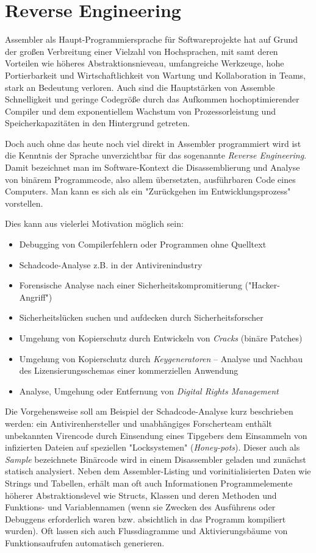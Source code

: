 \section{Reverse Engineering}

Assembler als Haupt-Programmiersprache für Softwareprojekte hat auf Grund der großen Verbreitung einer Vielzahl von Hochsprachen, mit samt deren Vorteilen wie höheres Abstraktionsnieveau, umfangreiche Werkzeuge, hohe Portierbarkeit und Wirtschaftlichkeit von Wartung und Kollaboration in Teams, stark an Bedeutung verloren. Auch sind die Hauptstärken von Assemble Schnelligkeit und geringe Codegröße durch das Aufkommen hochoptimierender Compiler und dem exponentiellem Wachstum von Prozessorleistung und Speicherkapazitäten in den Hintergrund getreten.

Doch auch ohne das heute noch viel direkt in Assembler programmiert wird ist die Kenntnis der Sprache unverzichtbar für das sogenannte \emph{Reverse Engineering}. Damit bezeichnet man im Software-Kontext die Disassemblierung und Analyse von binärem Programmcode, also allem übersetzten, ausführbaren Code eines Computers. Man kann es sich als ein "Zurückgehen im Entwicklungsprozess" vorstellen.\cite{Warden1992}

Dies kann aus vielerlei Motivation möglich sein:
\begin{itemize}
\item Debugging von Compilerfehlern oder Programmen ohne Quelltext
\item Schadcode-Analyse z.B. in der Antivirenindustry
\item Forensische Analyse nach einer Sicherheitskompromitierung ("Hacker-Angriff")
\item Sicherheitslücken suchen und aufdecken durch Sicherheitsforscher
\item Umgehung von Kopierschutz durch Entwickeln von \emph{Cracks} (binäre Patches)
\item Umgehung von Kopierschutz durch \emph{Keygeneratoren} – Analyse und Nachbau des Lizensierungsschemas einer kommerziellen Anwendung
\item Analyse, Umgehung oder Entfernung von \emph{Digital Rights Management}
\end{itemize}

Die Vorgehensweise soll am Beispiel der Schadcode-Analyse kurz beschrieben werden: ein Antivirenhersteller und unabhängiges Forscherteam enthält unbekannten Virencode durch Einsendung eines Tipgebers dem Einsammeln von infizierten Dateien auf speziellen "Locksystemen" (\emph{Honey-pots}). Dieser auch als \emph{Sample} bezeichnete Binärcode wird in einem Disassembler geladen und zunächst statisch analysiert. Neben dem Assembler-Listing und vorinitialisierten Daten wie Strings und Tabellen, erhält man oft auch Informationen Programmelemente höherer Abstraktionslevel wie Structs, Klassen und deren Methoden und Funktions- und Variablennamen (wenn sie Zwecken des Ausführens oder Debuggens erforderlich waren bzw. absichtlich in das Programm kompiliert wurden).
Oft lassen sich auch Flussdiagramme und Aktivierungsbäume von Funktionsaufrufen automatisch generieren.

